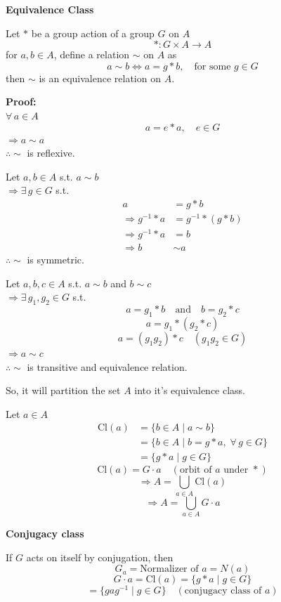 \documentclass[11pt]{article}
\begin{document}
\noindent \textbf{Equivalence Class}

\noindent Let $*$ be a group action of a group $G$ on $A$
\[
* : G \times A \to A
\]
for $a, b \in A$, define a relation $\sim$ on $A$ as
\[
a \sim b \iff a = g * b, \quad \text{for some } g \in G
\]
then $\sim$ is an equivalence relation on $A$.

\medskip
\noindent \textbf{Proof:} \\
$\forall\, a \in A$
\[
a = e * a, \quad e \in G
\]
$\Rightarrow a \sim a$ \\
$\therefore \sim$ is reflexive.

\noindent Let $a, b \in A$ s.t. $a \sim b$ \\
$\Rightarrow \exists\, g \in G$ s.t.
\begin{align*}
a &= g * b  \\
\Rightarrow g^{-1} * a &= g^{-1} * (g * b)  \\
\Rightarrow g^{-1} * a &= b  \\
\Rightarrow b &\sim a
\end{align*}
$\therefore \sim$ is symmetric.

\noindent Let $a, b, c \in A$ s.t. $a \sim b$ and $b \sim c$ \\
$\Rightarrow \exists\, g_1, g_2 \in G$ s.t.
\[
a = g_1 * b \quad \text{and} \quad b = g_2 * c
\]
\[
a = g_1 * (g_2 * c)
\]
\[
a = (g_1 g_2) * c \quad (g_1 g_2 \in G)
\]
$\Rightarrow a \sim c$ \\
$\therefore \sim$ is transitive and equivalence relation.

\newpage
\noindent So, it will partition the set $A$ into it's equivalence class.

\noindent Let $a \in A$
\begin{align*}
\text{Cl}(a) &= \{b \in A \mid a \sim b\}  \\
&= \{b \in A \mid b = g * a, \; \forall\, g \in G\}  \\
&= \{g * a \mid g \in G\}
\end{align*}
\[
\text{Cl}(a) = G \cdot a \quad (\text{orbit of } a \text{ under } *)
\]
\[
\Rightarrow A = \bigcup_{a \in A} \text{Cl}(a)
\]
\[
\Rightarrow A = \bigcup_{a \in A} G \cdot a
\]

\bigskip
\noindent \textbf{Conjugacy class}

\noindent If $G$ acts on itself by conjugation, then
\[
G_a = \text{Normalizer of } a = N(a)
\]
\[
G \cdot a = \text{Cl}(a) = \{g * a \mid g \in G\}
\]
\[
= \{gag^{-1} \mid g \in G\} \quad (\text{conjugacy class of } a)
\]
\end{document}
